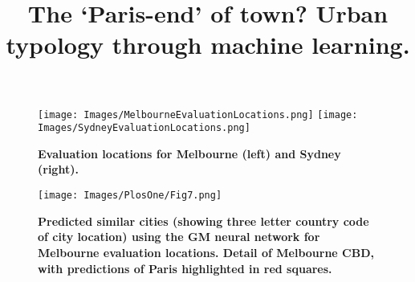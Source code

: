 \documentclass[Crown,sageh,times]{sagej}
\begin{document}
\title{The `Paris-end' of town? Urban typology through machine learning.}



\maketitle


\begin{figure}[!htbp]
\centering 
\texttt{[image: Images/MelbourneEvaluationLocations.png]}   
\texttt{[image: Images/SydneyEvaluationLocations.png]}    
\caption{\bf Evaluation locations for Melbourne (left) and Sydney (right).}    
 \label{fig:supp_melsydevallocations}  
\end{figure} 

\begin{figure}[!htbp]
\centering     
\texttt{[image: Images/PlosOne/Fig7.png]} 
\caption{\bf Predicted similar cities (showing three letter country code of city location) using the GM neural network for Melbourne evaluation locations. Detail of Melbourne CBD, with predictions of Paris highlighted in red squares.}    
 \label{fig:supp_melmapscbd}  
\end{figure} 
\end{document}

